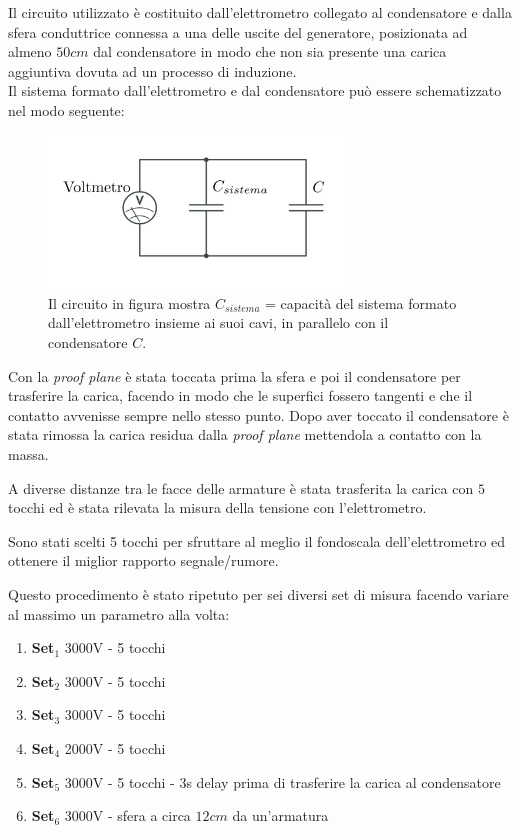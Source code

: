 {\fontsize{12}{14}\selectfont 

Il circuito utilizzato è costituito dall'elettrometro collegato al condensatore e dalla sfera conduttrice connessa a una delle uscite del generatore, posizionata ad almeno $50cm$ dal condensatore in modo che non sia presente una carica aggiuntiva dovuta ad un processo di induzione. 
\\
Il sistema formato dall'elettrometro e dal condensatore può essere schematizzato nel modo seguente:

\begin{figure}[H]
  \begin{minipage}[c]{0.4\textwidth}
    \includegraphics[width=8cm]{Figures/SchemaCircuitale3.png}
  \end{minipage}\hfill
  \begin{minipage}[c]{0.55\textwidth}
    \caption{
       Il circuito in figura mostra $C_{sistema}$ = capacità del sistema formato dall'elettrometro insieme ai suoi cavi, in parallelo con il condensatore $C$.
    } \label{fig:schemacircuitale}
  \end{minipage}
\end{figure}


Con la \emph{proof plane} è stata toccata prima la sfera e poi il condensatore per trasferire la carica, facendo in modo che le superfici fossero tangenti e che il contatto avvenisse sempre nello stesso punto. Dopo aver toccato il condensatore è stata rimossa la carica residua dalla \emph{proof plane} mettendola a contatto con la massa.

A diverse distanze tra le facce delle armature è stata trasferita la carica con $5$ tocchi ed è stata rilevata la misura della tensione con l'elettrometro.

Sono stati scelti 5 tocchi per sfruttare al meglio il fondoscala dell'elettrometro ed ottenere il miglior rapporto segnale/rumore.


Questo procedimento è stato ripetuto per sei diversi set di misura facendo variare al massimo un parametro alla volta:

\begin{enumerate}
    \item \textbf{Set$_1$} 3000V - 5 tocchi
    \item \textbf{Set$_2$} 3000V - 5 tocchi
    \item \textbf{Set$_3$} 3000V - 5 tocchi
    \item \textbf{Set$_4$} 2000V - 5 tocchi
    \item \textbf{Set$_5$} 3000V - 5 tocchi - 3s delay prima di trasferire la carica al condensatore
    \item \textbf{Set$_6$} 3000V - sfera a circa $12cm$ da un'armatura
\end{enumerate}

}
